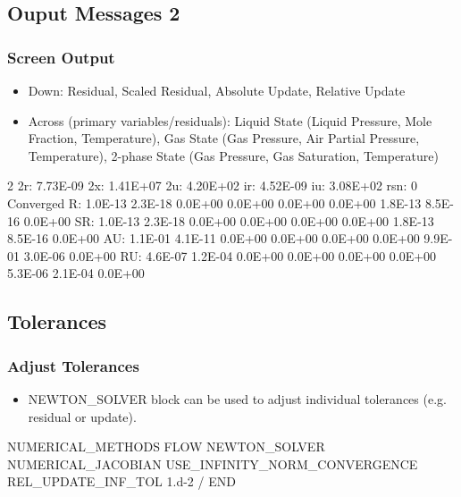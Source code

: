 \documentclass{beamer}
\newcommand\redcomment[1]{{{\color{red} #1}}}
\newcommand\bluecomment[1]{{{\color{blue} #1}}}
\begin{document}
\subsection{Ouput Messages 2}

\begin{frame}[fragile]\frametitle{Screen Output}

\begin{itemize}
\item \bluecomment{Down:} Residual, Scaled Residual, Absolute Update, Relative Update
\item \bluecomment{Across (primary variables/residuals):} Liquid State (Liquid Pressure, Mole Fraction, Temperature), Gas State (Gas Pressure, Air Partial Pressure, Temperature), 2-phase State (Gas Pressure, Gas Saturation, Temperature)
\end{itemize}

\begin{semiverbatim}
\scriptsize
2 2r: 7.73E-09 2x: 1.41E+07 2u: 4.20E+02 ir: 4.52E-09 iu: 3.08E+02 rsn:   0
   Converged
     R: 1.0E-13 2.3E-18 0.0E+00 0.0E+00 0.0E+00 0.0E+00 1.8E-13 8.5E-16 0.0E+00
    SR: 1.0E-13 2.3E-18 0.0E+00 0.0E+00 0.0E+00 0.0E+00 1.8E-13 8.5E-16 0.0E+00
    AU: 1.1E-01 4.1E-11 0.0E+00 0.0E+00 0.0E+00 0.0E+00 9.9E-01 3.0E-06 0.0E+00
    RU: 4.6E-07 1.2E-04 0.0E+00 0.0E+00 0.0E+00 0.0E+00 5.3E-06 2.1E-04 0.0E+00
\end{semiverbatim}

\end{frame}

\subsection{Tolerances}

\begin{frame}[fragile]\frametitle{Adjust Tolerances}

\begin{itemize}
\item \redcomment{NEWTON\_SOLVER} block can be used to adjust individual tolerances (e.g. residual or update).
\end{itemize}

\begin{semiverbatim}
NUMERICAL_METHODS FLOW
  NEWTON_SOLVER
    NUMERICAL_JACOBIAN
    USE_INFINITY_NORM_CONVERGENCE
    REL_UPDATE_INF_TOL 1.d-2
  /
END

\end{semiverbatim}
\end{frame}

\end{document}
